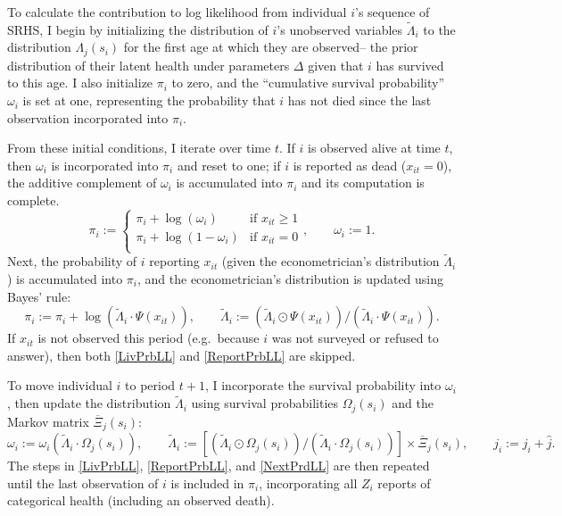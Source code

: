 \documentclass[12pt,pdftex,letterpaper]{article}
\newcommand{\Report}{x}
\newcommand{\Age}{j}
\newcommand{\Sex}{s}
\newcommand{\AgeIncr}{\hat{\Age}}
\newcommand{\ParamVec}{\Delta}
\newcommand{\LivPrb}{\Omega}
\newcommand{\CumLivPrb}{\omega}
\newcommand{\TransPrb}{\Xi}
\newcommand{\HealthDstn}{\Lambda}
\newcommand{\ReportPrb}{\Psi}
\newcommand{\HealthDstnPcvd}{\widetilde{\Lambda}}
\newcommand{\LL}{\pi}
\begin{document}
To calculate the contribution to log likelihood from individual $i$'s sequence of SRHS, I begin by initializing the distribution of $i$'s unobserved variables $\HealthDstnPcvd_{i}$ to the distribution $\HealthDstn_{\Age}(\Sex_i)$ for the first age at which they are observed-- the prior distribution of their latent health under parameters $\ParamVec$ given that $i$ has survived to this age.  I also initialize $\LL_i$ to zero, and the ``cumulative survival probability'' $\CumLivPrb_i$ is set at one, representing the probability that $i$ has not died since the last observation incorporated into $\LL_i$.

From these initial conditions, I iterate over time $t$. If $i$ is observed alive at time $t$, then $\CumLivPrb_i$ is incorporated into $\LL_i$ and reset to one; if $i$ is reported as dead ($\Report_{it} = 0$), the additive complement of $\CumLivPrb_{i}$ is accumulated into $\LL_i$ and its computation is complete.
\begin{equation}\label{LivPrbLL}
\LL_i := \begin{cases}
\LL_{i} + \log(\CumLivPrb_i) & \text{if } \Report_{it} \geq 1 \\
\LL_{i} + \log(1 - \CumLivPrb_i) & \text{if } \Report_{it} = 0 \\
\end{cases}, \qquad \CumLivPrb_i := 1.
\end{equation}
Next, the probability of $i$ reporting $\Report_{it}$ (given the econometrician's distribution $\HealthDstnPcvd_{i}$) is accumulated into $\LL_i$, and the econometrician's distribution is updated using Bayes' rule:
\begin{equation}\label{ReportPrbLL}
\LL_i := \LL_i + \log(\HealthDstnPcvd_{i} \cdot \ReportPrb(\Report_{it})), \qquad \HealthDstnPcvd_{i} := (\HealthDstnPcvd_{i} \odot \ReportPrb(\Report_{it})) / (\HealthDstnPcvd_{i} \cdot \ReportPrb(\Report_{it})).
\end{equation}
If $\Report_{it}$ is not observed this period (e.g.\ because $i$ was not surveyed or refused to answer), then both \eqref{LivPrbLL} and \eqref{ReportPrbLL} are skipped.

To move individual $i$ to period $t+1$, I incorporate the survival probability into $\CumLivPrb_{i}$, then update the  distribution $\HealthDstnPcvd_{i}$ using survival probabilities $\LivPrb_\Age(\Sex_i)$ and the Markov matrix $\overline{\TransPrb}_\Age(\Sex_i)$:
\begin{equation}\label{NextPrdLL}
\CumLivPrb_i := \CumLivPrb_i (\HealthDstnPcvd_{i} \cdot \LivPrb_\Age(\Sex_i)), \qquad \HealthDstnPcvd_{i} := \left[ (\HealthDstnPcvd_{i} \odot \LivPrb_\Age(\Sex_i)) / (\HealthDstnPcvd_{i} \cdot \LivPrb_\Age(\Sex_i)) \right] \times \overline{\TransPrb}_\Age(\Sex_i), \qquad \Age_i := \Age_i + \AgeIncr.
\end{equation}
The steps in \eqref{LivPrbLL}, \eqref{ReportPrbLL}, and \eqref{NextPrdLL} are then repeated until the last observation of $i$ is included in $\LL_i$, incorporating all $Z_i$ reports of categorical health (including an observed death).
\end{document}
